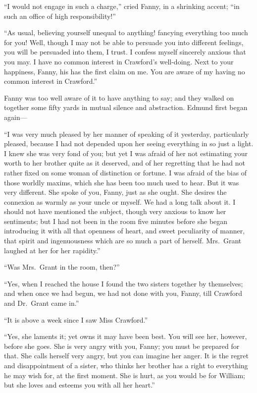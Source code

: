 ``I would not engage in such a charge,'' cried Fanny, in a
shrinking accent; ``in such an office of high responsibility!''

``As usual, believing yourself unequal to anything!
fancying everything too much for you!  Well, though I
may not be able to persuade you into different feelings,
you will be persuaded into them, I trust.
I confess myself sincerely anxious that you may.
I have no common interest in Crawford's well-doing. Next
to your happiness, Fanny, his has the first claim on me.
You are aware of my having no common interest in Crawford.''

Fanny was too well aware of it to have anything to say;
and they walked on together some fifty yards in mutual
silence and abstraction.  Edmund first began again---%

``I was very much pleased by her manner of speaking
of it yesterday, particularly pleased, because I had not
depended upon her seeing everything in so just a light.
I knew she was very fond of you; but yet I was afraid
of her not estimating your worth to her brother quite
as it deserved, and of her regretting that he had not
rather fixed on some woman of distinction or fortune.
I was afraid of the bias of those worldly maxims, which she
has been too much used to hear.  But it was very different.
She spoke of you, Fanny, just as she ought.  She desires
the connexion as warmly as your uncle or myself.
We had a long talk about it.  I should not have mentioned
the subject, though very anxious to know her sentiments;
but I had not been in the room five minutes before she
began introducing it with all that openness of heart,
and sweet peculiarity of manner, that spirit and ingenuousness
which are so much a part of herself.  Mrs.\ Grant laughed
at her for her rapidity.''

``Was Mrs.\ Grant in the room, then?''

``Yes, when I reached the house I found the two sisters
together by themselves; and when once we had begun,
we had not done with you, Fanny, till Crawford and Dr.\ Grant
came in.''

``It is above a week since I saw Miss Crawford.''

``Yes, she laments it; yet owns it may have been best.
You will see her, however, before she goes.  She is very
angry with you, Fanny; you must be prepared for that.
She calls herself very angry, but you can imagine her anger.
It is the regret and disappointment of a sister,
who thinks her brother has a right to everything he may
wish for, at the first moment.  She is hurt, as you would
be for William; but she loves and esteems you with all
her heart.''

